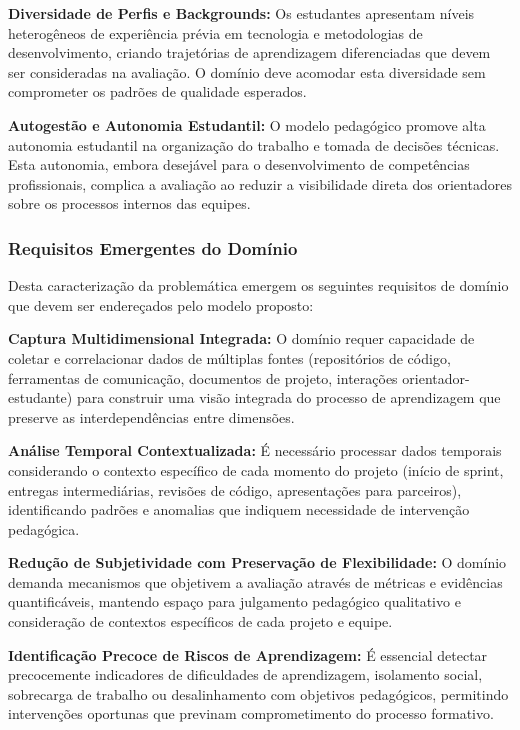\documentclass[english, spanish, brazilian]{modelo_dt}
\begin{document}
\textbf{Diversidade de Perfis e Backgrounds:} Os estudantes apresentam níveis heterogêneos de experiência prévia em tecnologia e metodologias de desenvolvimento, criando trajetórias de aprendizagem diferenciadas que devem ser consideradas na avaliação. O domínio deve acomodar esta diversidade sem comprometer os padrões de qualidade esperados.

\textbf{Autogestão e Autonomia Estudantil:} O modelo pedagógico promove alta autonomia estudantil na organização do trabalho e tomada de decisões técnicas. Esta autonomia, embora desejável para o desenvolvimento de competências profissionais, complica a avaliação ao reduzir a visibilidade direta dos orientadores sobre os processos internos das equipes.

\subsubsection{Requisitos Emergentes do Domínio}

Desta caracterização da problemática emergem os seguintes requisitos de domínio que devem ser endereçados pelo modelo proposto:

\textbf{Captura Multidimensional Integrada:} O domínio requer capacidade de coletar e correlacionar dados de múltiplas fontes (repositórios de código, ferramentas de comunicação, documentos de projeto, interações orientador-estudante) para construir uma visão integrada do processo de aprendizagem que preserve as interdependências entre dimensões.

\textbf{Análise Temporal Contextualizada:} É necessário processar dados temporais considerando o contexto específico de cada momento do projeto (início de sprint, entregas intermediárias, revisões de código, apresentações para parceiros), identificando padrões e anomalias que indiquem necessidade de intervenção pedagógica.

\textbf{Redução de Subjetividade com Preservação de Flexibilidade:} O domínio demanda mecanismos que objetivem a avaliação através de métricas e evidências quantificáveis, mantendo espaço para julgamento pedagógico qualitativo e consideração de contextos específicos de cada projeto e equipe.

\textbf{Identificação Precoce de Riscos de Aprendizagem:} É essencial detectar precocemente indicadores de dificuldades de aprendizagem, isolamento social, sobrecarga de trabalho ou desalinhamento com objetivos pedagógicos, permitindo intervenções oportunas que previnam comprometimento do processo formativo.
\end{document}
